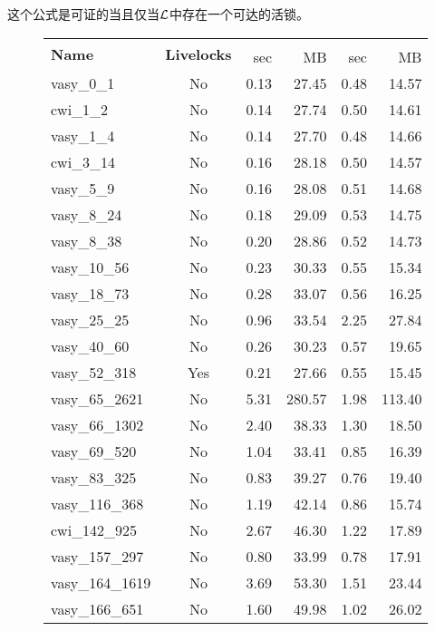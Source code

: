 这个公式是可证的当且仅当$\cal L$中存在一个可达的活锁。


\begin{figure}[h!]
	\centering
	\scriptsize
	\begin{tabular}{| l | c | r | r | r | r |}
		\hline
		\multirow{2}{1cm}{\textbf{Name}} & \multirow{2}{1.5cm}{\textbf{Livelocks}} & \multicolumn{2}{c|}{\sctlprov{}} & \multicolumn{2}{c|}{\CADP{}}\\
		\cline{3-6}
		{}&{} & sec & MB & sec & MB\\
		\hline
		
		vasy\_0\_1 & No &0.13 &	27.45 &	0.48 &	14.57 \\\hline
		cwi\_1\_2 & No &0.14 &	27.74 &	0.50 &	14.61 \\\hline
		vasy\_1\_4 	& No &0.14& 	27.70& 	0.48 &	14.66 \\\hline
		cwi\_3\_14 	& No &0.16 &	28.18 &	0.50 &	14.57 \\\hline
		vasy\_5\_9 	& No &0.16 	&28.08 &	0.51 &	14.68 \\\hline
		vasy\_8\_24 & No &0.18 	&29.09 &	0.53 &	14.75 \\\hline
		vasy\_8\_38 & No &0.20 	&28.86 	&0.52 &	14.73 \\\hline
		vasy\_10\_56 &	No &0.23 &	30.33 &	0.55 &	15.34 \\\hline
		vasy\_18\_73 &	No &0.28 &	33.07 &	0.56 &	16.25 \\\hline
		vasy\_25\_25 &	No &0.96 &	33.54 &	2.25 &	27.84 \\\hline
		vasy\_40\_60 &	No &0.26 &	30.23 &	0.57 &	19.65 \\\hline
		vasy\_52\_318 &	Yes &0.21 &	27.66 &	0.55 &	15.45 \\\hline
		vasy\_65\_2621 & No &5.31 &	280.57 &	1.98 &	113.40 \\\hline
		vasy\_66\_1302 & No &2.40 &	38.33 &	1.30 &	18.50 \\\hline
		vasy\_69\_520 &	No &1.04 &	33.41 &	0.85 &	16.39 \\\hline
		vasy\_83\_325 &	No &0.83 &	39.27 &	0.76 &	19.40 \\\hline
		vasy\_116\_368 & No &1.19 &	42.14 &	0.86 &	15.74 \\\hline
		cwi\_142\_925 & No &2.67 &	46.30 &	1.22 &	17.89 \\\hline
		vasy\_157\_297 & No &0.80 &	33.99 &	0.78 &	17.91 \\\hline
		vasy\_164\_1619 & No &3.69 &	53.30 &	1.51& 	23.44 \\\hline
		vasy\_166\_651 & No &1.60 	&49.98 &	1.02 &	26.02 \\\hline

\end{tabular}
\end{figure}
